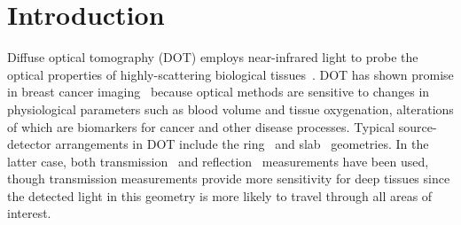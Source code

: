 \chapter{Introduction}


Diffuse optical tomography (DOT) employs near-infrared light to probe the optical properties of highly-scattering biological tissues~\cite{arridge_99_1,boas_01_1,arridge_09_1}. DOT has shown
promise in breast cancer imaging~\cite{colak_99_1,hawrysz_00_1,mcbride_01_1,culver_03_1,intes_03_1,li_03_1,choe_05_1,yates_05_1,corlu_07_1,cerussi_07_1,choe_09_1,durduran_10_1} because optical methods are sensitive to changes in physiological parameters such as blood volume and tissue oxygenation, alterations of which are biomarkers for cancer and other disease processes.  Typical source-detector arrangements in DOT include the ring~\cite{pogue_95_1} and slab~\cite{grosenick_05_1,pifferi_03_1,choe_09_1} geometries. In the latter case, both transmission~\cite{choe_09_1} and reflection~\cite{ge_08_1} measurements have been used, though transmission measurements provide more sensitivity for deep tissues since the detected light in this geometry is more likely to travel through all areas of interest.
